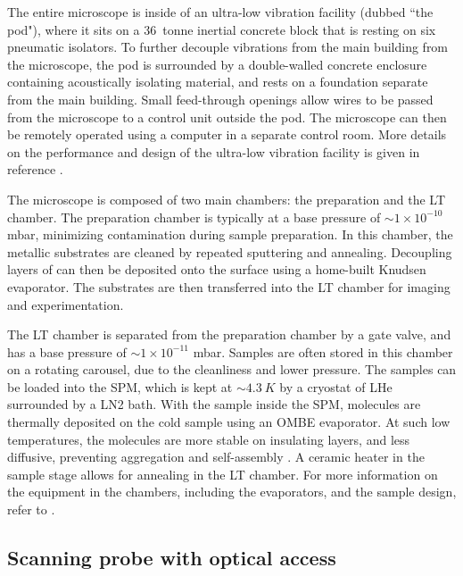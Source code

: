 The entire microscope is inside of an ultra-low vibration facility (dubbed ``the pod"), where it sits on a \SI{36}{tonne} inertial concrete block that is resting on six pneumatic isolators. To further decouple vibrations from the main building from the microscope, the pod is surrounded by a double-walled concrete enclosure containing acoustically isolating material, and rests on a foundation separate from the main building. Small feed-through openings allow wires to be passed from the microscope to a control unit outside the pod. The microscope can then be remotely operated using a computer in a separate control room. More details on the performance and design of the ultra-low vibration facility is given in reference \citep{macleod2015ultra}.

The microscope is composed of two main chambers: the preparation and the \acf{LT} chamber. The preparation chamber is typically at a base pressure of $\sim 1\times 10^{-10}$ mbar, minimizing contamination during sample preparation. In this chamber, the metallic substrates are cleaned by repeated sputtering and annealing. Decoupling layers of  can then be deposited onto the surface using a home-built Knudsen evaporator. The substrates are then transferred into the \ac{LT} chamber for imaging and experimentation.

The \ac{LT} chamber is separated from the preparation chamber by a gate valve, and has a base pressure of $\sim 1\times 10^{-11}$ mbar. Samples are often stored in this chamber on a rotating carousel, due to the cleanliness and lower pressure. The samples can be loaded into the \ac{SPM}, which is kept at $\sim \SI{4.3}{K}$ by a cryostat of \acf{LHe} surrounded by a \acf{LN2} bath. With the sample inside the \ac{SPM}, molecules are thermally deposited on the cold sample using an \ac{OMBE} evaporator. At such low temperatures, the molecules are more stable on insulating  layers, and less diffusive, preventing aggregation and self-assembly . A ceramic heater in the sample stage allows for annealing in the \ac{LT} chamber. For more information on the equipment in the chambers, including the evaporators, and the sample design, refer to \citep{cochrane2017single, roussy2016coupling}. 



\subsection{Scanning probe with optical access}

